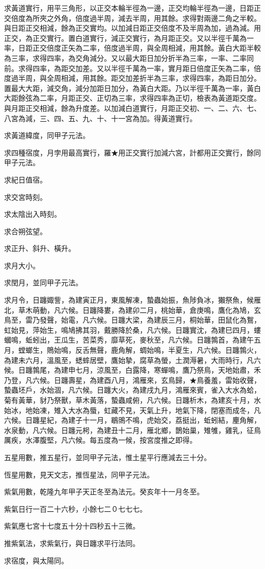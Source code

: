 \begin{pinyinscope}
求黃道實行，用平三角形，以正交本輪半徑為一邊，正交均輪半徑為一邊，日距正交倍度為所夾之外角，倍度過半周，減去半周，用其餘。求得對兩邊二角之半較。與日距正交相減，餘為正交實均。以加減日距正交倍度不及半周為加，過為減。用正交，為正交實行。置白道實行，減正交實行，為月距正交。又以半徑千萬為一率，日距正交倍度正矢為二率，倍度過半周，與全周相減，用其餘。黃白大距半較為三率，求得四率，為交角減分。又以最大距日加分折半為三率，一率、二率同前。求得四率，為距交加差。又以半徑千萬為一率，實月距日倍度正矢為二率，倍度過半周，與全周相減，用其餘。距交加差折半為三率，求得四率，為距日加分。置最大大距，減交角，減分加距日加分，為黃白大距。乃以半徑千萬為一率，黃白大距餘弦為二率，月距正交、正切為三率，求得四率為正切，檢表為黃道距交度。與月距正交相減，餘為升度差。以加減白道實行，月距正交初、一、二、六、七、八宮為減，三、四、五、九、十、十一宮為加。得黃道實行。

求黃道緯度，同甲子元法。

求四種宿度，月孛用最高實行，羅★用正交實行加減六宮，計都用正交實行，餘同甲子元法。

求紀日值宿。

求交宮時刻。

求太陰出入時刻。

求合朔弦望。

求正升、斜升、橫升。

求月大小。

求閏月，並同甲子元法。

求月令，日躔娵訾，為建寅正月，東風解凍，蟄蟲始振，魚陟負冰，獺祭魚，候雁北，草木萌動，凡六候。日躔降婁，為建卯二月，桃始華，倉庚鳴，鷹化為鳩，玄鳥至，雷乃發聲，始電，凡六候。日躔大梁，為建辰三月，桐始華，田鼠化為鴽，虹始見，萍始生，鳴鳩拂其羽，戴勝降於桑，凡六候。日躔實沈，為建巳四月，螻蟈鳴，蚯蚓出，王瓜生，苦菜秀，靡草死，麥秋至，凡六候。日躔鶉首，為建午五月，螳螂生，鵙始鳴，反舌無聲，鹿角解，蜩始鳴，半夏生，凡六候。日躔鶉火，為建未六月，溫風至，蟋蟀居壁，鷹始摯，腐草為螢，土潤溽暑，大雨時行，凡六候。日躔鶉尾，為建申七月，涼風至，白露降，寒蟬鳴，鷹乃祭鳥，天地始肅，禾乃登，凡六候。日躔壽星，為建酉八月，鴻雁來，玄鳥歸，★鳥養羞，雷始收聲，蟄蟲坯戶，水始涸，凡六候。日躔大火，為建戌九月，鴻雁來賓，雀入大水為蛤，菊有黃華，豺乃祭獸，草木黃落，蟄蟲咸俯，凡六候。日躔析木，為建亥十月，水始冰，地始凍，雉入大水為蜃，虹藏不見，天氣上升，地氣下降，閉塞而成冬，凡六候。日躔星紀，為建子十一月，鶡鴠不鳴，虎始交，荔挺出，蚯蚓結，麈角解，水泉動，凡六候。日躔元枵，為建丑十二月，雁北鄉，鵲始巢，雉雊，雞乳，征鳥厲疾，水澤腹堅，凡六候。每五度為一候，按宮度推之即得。

五星用數，推五星行，並同甲子元法，惟土星平行應減去三十分。

恆星用數，見天文志，推恆星法，同甲子元法。

紫氣用數，乾隆九年甲子天正冬至為法元。癸亥年十一月冬至。

紫氣日行一百二十六秒，小餘七二０七七七。

紫氣應七宮十七度五十分十四秒五十三微。

推紫氣法，求紫氣行，與日躔求平行法同。

求宿度，與太陽同。


\end{pinyinscope}